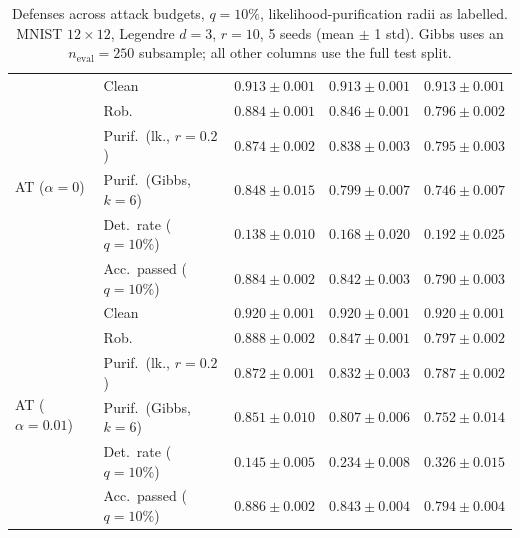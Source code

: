 \begin{table}[htbp]
\begin{tabular}{@{}llrrr@{}}
    \cmidrule(lr){1-5}
    \multirow{6}{*}{AT ($\alpha{=}0$)} & Clean & $0.913 \pm 0.001$ & $0.913 \pm 0.001$ & $0.913 \pm 0.001$ \\
     & Rob. & $0.884 \pm 0.001$ & $0.846 \pm 0.001$ & $0.796 \pm 0.002$ \\
     & Purif.\ (lk., $r{=}0.2$) & $0.874 \pm 0.002$ & $\mathbf{0.838 \pm 0.003}$ & $\mathbf{0.795 \pm 0.003}$ \\
     & Purif.\ (Gibbs, $k{=}6$) & $0.848 \pm 0.015$ & $0.799 \pm 0.007$ & $0.746 \pm 0.007$ \\
     & Det.\ rate ($q{=}10\%$) & $0.138 \pm 0.010$ & $0.168 \pm 0.020$ & $0.192 \pm 0.025$ \\
     & Acc.\ passed ($q{=}10\%$) & $0.884 \pm 0.002$ & $0.842 \pm 0.003$ & $0.790 \pm 0.003$ \\
    \cmidrule(lr){1-5}
    \multirow{6}{*}{AT ($\alpha{=}0.01$)} & Clean & $0.920 \pm 0.001$ & $0.920 \pm 0.001$ & $0.920 \pm 0.001$ \\
     & Rob. & $\mathbf{0.888 \pm 0.002}$ & $\mathbf{0.847 \pm 0.001}$ & $\mathbf{0.797 \pm 0.002}$ \\
     & Purif.\ (lk., $r{=}0.2$) & $0.872 \pm 0.001$ & $0.832 \pm 0.003$ & $0.787 \pm 0.002$ \\
     & Purif.\ (Gibbs, $k{=}6$) & $0.851 \pm 0.010$ & $\mathbf{0.807 \pm 0.006}$ & $\mathbf{0.752 \pm 0.014}$ \\
     & Det.\ rate ($q{=}10\%$) & $0.145 \pm 0.005$ & $0.234 \pm 0.008$ & $0.326 \pm 0.015$ \\
     & Acc.\ passed ($q{=}10\%$) & $\mathbf{0.886 \pm 0.002}$ & $\mathbf{0.843 \pm 0.004}$ & $\mathbf{0.794 \pm 0.004}$ \\
    \bottomrule
  \end{tabular}
  \caption{Defenses across attack budgets, $q{=}10\%$, likelihood-purification radii as labelled. MNIST $12\times12$, Legendre $d{=}3$, $r{=}10$, 5 seeds (mean $\pm$ 1 std). Gibbs uses an $n_{\mathrm{eval}}=250$ subsample; all other columns use the full test split.}
  \label{tab:mnist_r12_models_r10}
\end{table}
